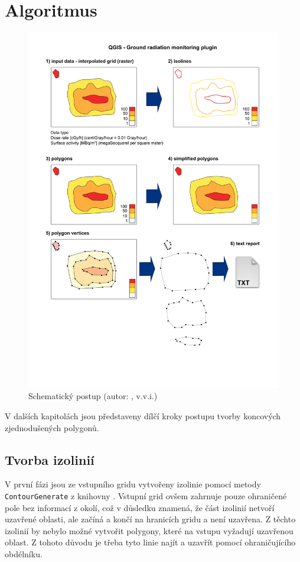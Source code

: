 \section{Algoritmus}

\begin{figure}[H]
    \centering
      \includegraphics[width=350pt]{./pictures/ACR_radiacni_pruzkum_polygony_v3.png}
      \caption[Schematický postup]{Schematický postup (autor: , v.v.i.)}
      \label{fig:schema}
\end{figure}

V dalších kapitolách jsou představeny dílčí kroky postupu tvorby
koncových zjednodušených polygonů.

\subsection{Tvorba izolinií}

V první fázi jsou ze vstupního gridu vytvořeny izolinie pomocí metody
\texttt{ContourGenerate} z knihovny . Vstupní grid ovšem
zahrnuje pouze ohraničené pole bez informací z okolí, což v důsledku znamená, že
část izolinií netvoří uzavřené oblasti, ale začíná a končí na
hranicích gridu a není uzavřena. Z těchto izolinií by nebylo možné
vytvořit polygony, které na vstupu vyžadují uzavřenou oblast. Z tohoto
důvodu je třeba tyto linie najít a uzavřít pomocí ohraničujícího
obdélníku.

